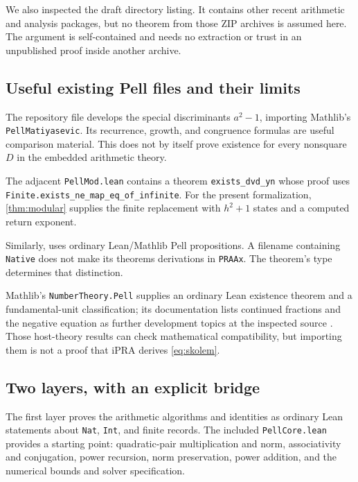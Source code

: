\documentclass[11pt,letterpaper]{article}
\theoremstyle{definition}
\newcommand{\code}[1]{\texttt{#1}}
\begin{document}
We also inspected the draft directory listing. It contains other recent
arithmetic and analysis packages, but no theorem from those ZIP archives is
assumed here. The argument is self-contained and needs no extraction or
trust in an unpublished proof inside another archive.

\subsection{Useful existing Pell files and their limits}

The repository file
develops the special discriminants $a^2-1$, importing Mathlib's
\code{PellMatiyasevic}. Its recurrence, growth, and congruence formulas are
useful comparison material. This does not by itself prove existence for
every nonsquare $D$ in the embedded arithmetic theory.

The adjacent \code{PellMod.lean} contains a theorem
\code{exists\_dvd\_yn} whose proof uses
\code{Finite.exists\_ne\_map\_eq\_of\_infinite}. For the present
formalization, \cref{thm:modular} supplies the finite replacement with
$h^2+1$ states and a computed return exponent.

Similarly,
uses ordinary Lean/Mathlib Pell propositions. A filename containing
\code{Native} does not make its theorems derivations in \code{PRAAx}.
The theorem's type determines that distinction.

Mathlib's \code{NumberTheory.Pell} supplies an ordinary Lean existence
theorem and a fundamental-unit classification; its documentation lists
continued fractions and the negative equation as further development
topics at the inspected source \cite{mathlib-pell}. Those host-theory
results can check mathematical compatibility, but importing them is not
a proof that iPRA derives \eqref{eq:skolem}.

\subsection{Two layers, with an explicit bridge}

The first layer proves the arithmetic algorithms and identities as ordinary
Lean statements about \code{Nat}, \code{Int}, and finite records.
The included \code{PellCore.lean} provides a starting point: quadratic-pair
multiplication and norm, associativity and conjugation, power recursion,
norm preservation, power addition, and the numerical bounds and solver
specification.
\end{document}
